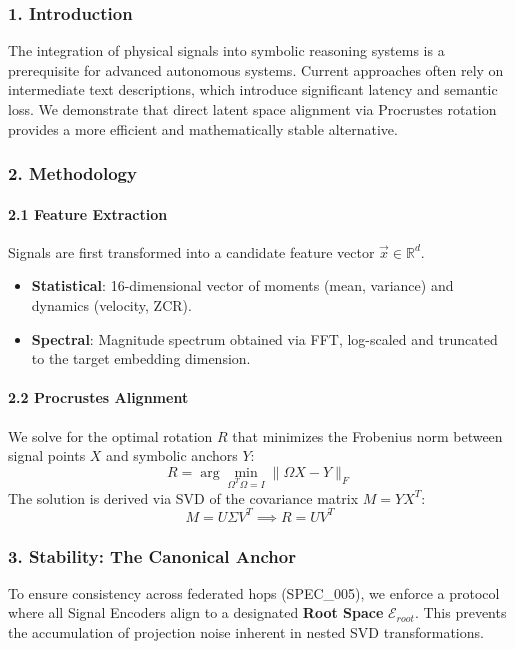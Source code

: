 \documentclass[10pt,journal,compsoc]{IEEEtran}
\begin{document}
\subsubsection{1. Introd\-uction}
The integration of physical signals into symbolic reasoning systems is a prere\-quisite for advanced autonomous systems. Current approaches often rely on inter\-mediate text descr\-iptions, which introduce significant latency and semantic loss. We demonstrate that direct latent space alignment via Procrustes rotation provides a more efficient and mathe\-matically stable alternative.

\subsubsection{2. Methodology}

\paragraph{2.1 Feature Extraction}
Signals are first transformed into a candidate feature vector $\vec{x} \in \mathbb{R}^d$.
\begin{itemize}
\item \textbf{Statistical}: 16-dimensional vector of moments (mean, variance) and dynamics (velocity, ZCR).
\item \textbf{Spectral}: Magnitude spectrum obtained via FFT, log-scaled and truncated to the target embedding dimension.

\end{itemize}
\paragraph{2.2 Procrustes Alignment}
We solve for the optimal rotation $R$ that minimizes the Frobenius norm between signal points $X$ and symbolic anchors $Y$:
\begin{equation}
R = \arg\min_{\Omega^T\Omega=I} \| \Omega X - Y \|_F
\end{equation}
The solution is derived via SVD of the covariance matrix $M = Y X^T$:
\begin{equation}
M = U \Sigma V^T \implies R = U V^T
\end{equation}

\subsubsection{3. Stability: The Canonical Anchor}
To ensure consistency across federated hops (SPEC\_005), we enforce a protocol where all Signal Encoders align to a designated \textbf{Root Space} $\mathcal{E}_{root}$. This prevents the accum\-ulation of projection noise inherent in nested SVD trans\-formations.
\end{document}
